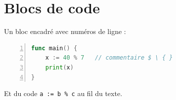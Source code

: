 \documentclass{article}
\begin{document}
\hsize=380pt
\section{Blocs de code}
Un bloc encadr\'e avec num\'eros de ligne :
\begin{lstlisting}[language=Go,numbers=left,frame=single]
func main() {
    x := 40 % 7   // commentaire $ \ { }
    print(x)
}
\end{lstlisting}
Et du code \lstinline|a := b % c| au fil du texte.
\end{document}
